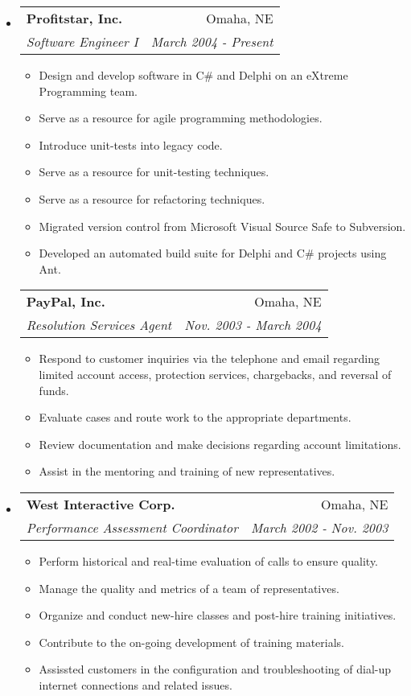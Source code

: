 \documentclass[letterpaper,11pt]{article}
\makeatletter
\newcommand{\resitem}[1]{\item #1 \vspace{-2pt}}
\newcommand{\resheading}[1]{{\large \parashade[.8]{sharpcorners}{\textbf{#1 \vphantom{p\^{E}}}}}}
\newcommand{\ressubheading}[4]{
\begin{tabular*}{6.5in}{l@{\extracolsep{\fill}}r}
  \textbf{#1} & #2 \\
  \textit{#3} & \textit{#4} \\
\end{tabular*}\vspace{-6pt}}
\makeatother
\begin{document}
\resheading{Work Experience}
\begin{itemize}

\item
  \ressubheading{Profitstar, Inc.}{Omaha, NE}
  {Software Engineer I}{March 2004 - Present}
  \begin{itemize}
    \resitem{Design and develop software in C\# and Delphi on an eXtreme
      Programming team.}
    \resitem{Serve as a resource for agile programming methodologies.}
    \resitem{Introduce unit-tests into legacy code.}
    \resitem{Serve as a resource for unit-testing techniques.}
    \resitem{Serve as a resource for refactoring techniques.}
    \resitem{Migrated version control from Microsoft Visual Source Safe to Subversion.}
    \resitem{Developed an automated build suite for Delphi and C\# projects using Ant.}
  \end{itemize}

  \ressubheading{PayPal, Inc.}{Omaha, NE}
  {Resolution Services Agent}{Nov. 2003 - March 2004}
  \begin{itemize}
    \resitem{Respond to customer inquiries via the telephone and email
      regarding limited account access, protection services, chargebacks, and
      reversal of funds.}
    \resitem{Evaluate cases and route work to the appropriate departments.}
    \resitem{Review documentation and make decisions regarding account
      limitations.}
    \resitem{Assist in the mentoring and training of new representatives.}
  \end{itemize}


\item
  \ressubheading{West Interactive Corp.}{Omaha, NE}
  {Performance Assessment Coordinator}{March 2002 - Nov. 2003}
  \begin{itemize}
    \resitem{Perform historical and real-time evaluation of calls to
      ensure quality.}
    \resitem{Manage the quality and metrics of a team of
      representatives.}
    \resitem{Organize and conduct new-hire classes and post-hire
      training initiatives.}
    \resitem{Contribute to the on-going development of training
      materials.}
    \resitem{Assissted customers in the configuration and
      troubleshooting of dial-up internet connections and related
      issues.}
  \end{itemize}


\end{itemize}
\end{document}
